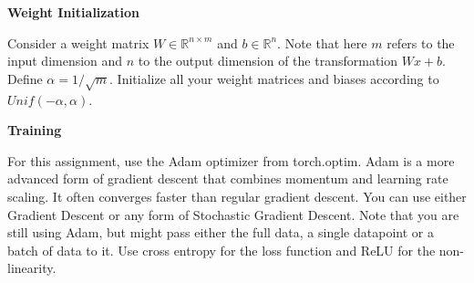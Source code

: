 \documentclass{article}
\newcommand{\field}[1]{\mathbb{#1}}
\newcommand{\1}{\mathbf{1}}
\newcommand{\R}{\field{R}} %
\begin{document}
\textbf{Weight Initialization}

Consider a weight matrix $W\in\R^{n\times m}$ and $b\in\R^n$. Note that here $m$ refers to the input dimension and $n$ to the output dimension of the transformation $Wx+b$. Define $\alpha = 1/\sqrt m$. Initialize all your weight matrices and biases according to $Unif(-\alpha,\alpha)$.

\textbf{Training} 

For this assignment, use the Adam optimizer from torch.optim. Adam is a more advanced form of gradient descent that combines momentum and learning rate scaling. It often  converges faster than regular gradient descent. You can use either Gradient Descent or any form of Stochastic Gradient Descent. Note that you are still using Adam,  but might pass either the full data, a single datapoint or a batch of data to it. Use cross entropy for the loss function and ReLU for the non-linearity.
\end{document}
